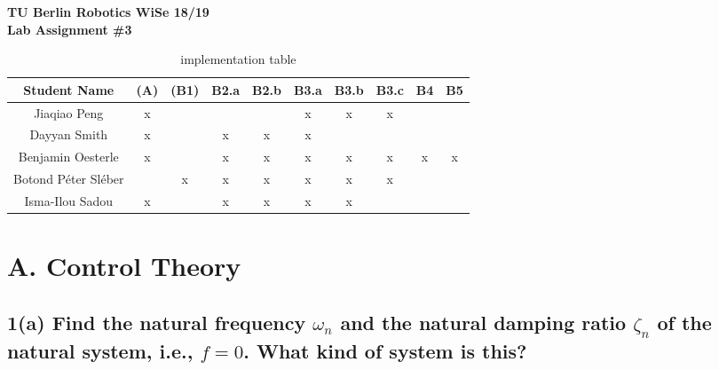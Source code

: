 \documentclass[a4paper,10pt]{article}
\begin{document}
\begin{center}
  \textbf{\Huge TU Berlin Robotics WiSe 18/19} \\
  \textbf{\huge Lab Assignment \#3}
\end{center}

\vfill

\begin{table}[h!]
  \begin{center}
    \begin{tabular}{c|c|c|c|c|c|c|c|c|c}
      Student Name    & \textbf{(A)} & \textbf{(B1)} & \textbf{B2.a} & \textbf{B2.b} & \textbf{B3.a} & \textbf{B3.b} & \textbf{B3.c} & \textbf{B4} & \textbf{B5}\\\hline\hline
      Jiaqiao Peng    &       x      &       ~       &       ~       &       ~       &       x       &       x       &       x       &      ~      &      ~     \\\hline
      Dayyan Smith    &       x      &       ~       &       x       &       x       &       x       &       ~       &       ~       &      ~      &      ~     \\\hline
      Benjamin Oesterle  &       x      &       ~       &       x       &       x       &       x       &       x       &       x       &      x      &      x     \\\hline
      Botond Péter Sléber &       ~      &       x       &       x       &       x       &       x       &       x       &       x       &      ~      &      ~ \\\hline
      Isma-Ilou Sadou &       x      &       ~       &       x       &       x       &       x       &       x       &       ~       &      ~      &      ~
    \end{tabular}
    \caption{implementation table}
  \end{center}
\end{table}

\newpage


\section*{A. Control Theory}

\subsection*{1(a) Find the natural frequency $\omega_n$ and the natural damping ratio $\zeta_n$ of the natural system, i.e., $f = 0$. What kind of system is this?}
\end{document}
